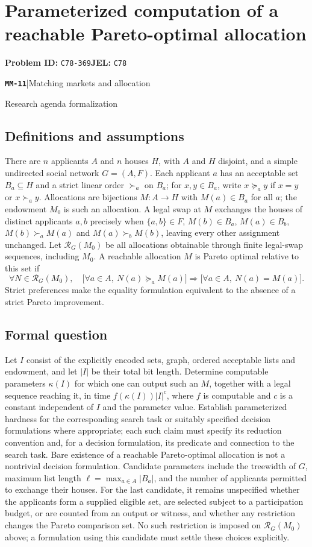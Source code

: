 \documentclass[11pt,a4paper]{article}
\newcommand{\entrymeta}[3]{{\sffamily\small\color{muted}\textbf{\texttt{#1}}\quad|\quad #2\par #3\par}}
\begin{document}
\section*{Parameterized computation of a reachable Pareto-optimal allocation}
\textbf{Problem ID:} \texttt{C78-369}\quad \textbf{JEL:} \texttt{C78}\par
\label{problem:OP-0552}
\label{beyond:MM-11}
\entrymeta{MM-11}{Matching markets and allocation}{Research agenda formalization}
\subsection*{Definitions and assumptions}
There are $n$ applicants $A$ and $n$ houses $H$, with $A$ and $H$ disjoint, and a simple undirected social network $G=(A,F)$. Each applicant $a$ has an acceptable set $B_a\subseteq H$ and a strict linear order $\succ_a$ on $B_a$; for $x,y\in B_a$, write $x\succeq_a y$ if $x=y$ or $x\succ_a y$. Allocations are bijections $M:A\to H$ with $M(a)\in B_a$ for all $a$; the endowment $M_0$ is such an allocation. A legal swap at $M$ exchanges the houses of distinct applicants $a,b$ precisely when $\{a,b\}\in F$, $M(b)\in B_a$, $M(a)\in B_b$, $M(b)\succ_a M(a)$ and $M(a)\succ_b M(b)$, leaving every other assignment unchanged. Let $\mathcal R_G(M_0)$ be all allocations obtainable through finite legal-swap sequences, including $M_0$. A reachable allocation $M$ is Pareto optimal relative to this set if
\[
 \forall N\in\mathcal R_G(M_0),\quad
 \bigl[\forall a\in A,\ N(a)\succeq_a M(a)\bigr]
 \Longrightarrow \bigl[\forall a\in A,\ N(a)=M(a)\bigr].
\]
Strict preferences make the equality formulation equivalent to the absence of a strict Pareto improvement.
\subsection*{Formal question}
Let $I$ consist of the explicitly encoded sets, graph, ordered acceptable lists and endowment, and let $|I|$ be their total bit length. Determine computable parameters $\kappa(I)$ for which one can output such an $M$, together with a legal sequence reaching it, in time $f(\kappa(I))|I|^c$, where $f$ is computable and $c$ is a constant independent of $I$ and the parameter value. Establish parameterized hardness for the corresponding search task or suitably specified decision formulations where appropriate; each such claim must specify its reduction convention and, for a decision formulation, its predicate and connection to the search task. Bare existence of a reachable Pareto-optimal allocation is not a nontrivial decision formulation. Candidate parameters include the treewidth of $G$, maximum list length $\ell=\max_{a\in A}|B_a|$, and the number of applicants permitted to exchange their houses. For the last candidate, it remains unspecified whether the applicants form a supplied eligible set, are selected subject to a participation budget, or are counted from an output or witness, and whether any restriction changes the Pareto comparison set. No such restriction is imposed on $\mathcal R_G(M_0)$ above; a formulation using this candidate must settle these choices explicitly.
\end{document}
